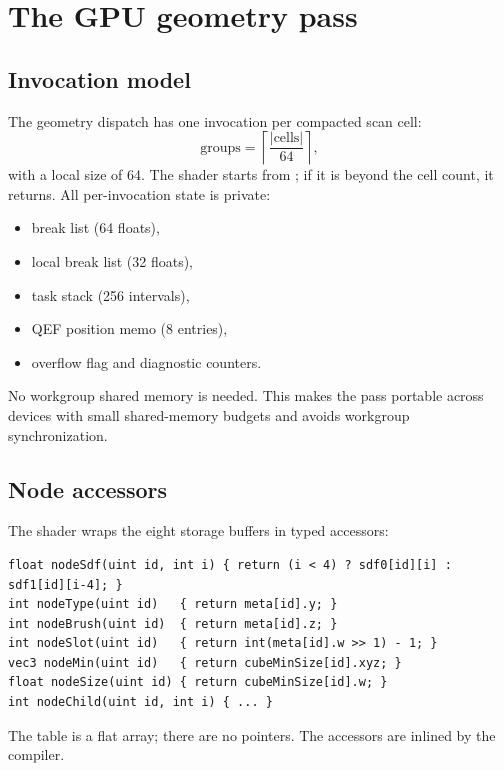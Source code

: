\section{The GPU geometry pass}
\label{sec:gpuwalk}

\subsection{Invocation model}

The geometry dispatch has one invocation per compacted scan cell:
\begin{equation}
  \text{groups} = \left\lceil \frac{|\text{cells}|}{64} \right\rceil,
\end{equation}
with a local size of 64.  The shader starts from
; if it is beyond the cell count, it
returns.  All per-invocation state is private:
\begin{itemize}
\item break list (64 floats),
\item local break list (32 floats),
\item task stack (256 intervals),
\item QEF position memo (8 entries),
\item overflow flag and diagnostic counters.
\end{itemize}
No workgroup shared memory is needed.  This makes the pass portable across
devices with small shared-memory budgets and avoids workgroup
synchronization.

\subsection{Node accessors}

The shader wraps the eight storage buffers in typed accessors:
\begin{lstlisting}[style=glsl,caption={Node accessors (abridged).},label={lst:accessors}]
float nodeSdf(uint id, int i) { return (i < 4) ? sdf0[id][i] : sdf1[id][i-4]; }
int nodeType(uint id)   { return meta[id].y; }
int nodeBrush(uint id)  { return meta[id].z; }
int nodeSlot(uint id)   { return int(meta[id].w >> 1) - 1; }
vec3 nodeMin(uint id)   { return cubeMinSize[id].xyz; }
float nodeSize(uint id) { return cubeMinSize[id].w; }
int nodeChild(uint id, int i) { ... }
\end{lstlisting}
The table is a flat array; there are no pointers.  The accessors are
inlined by the compiler.

\subsection{}

